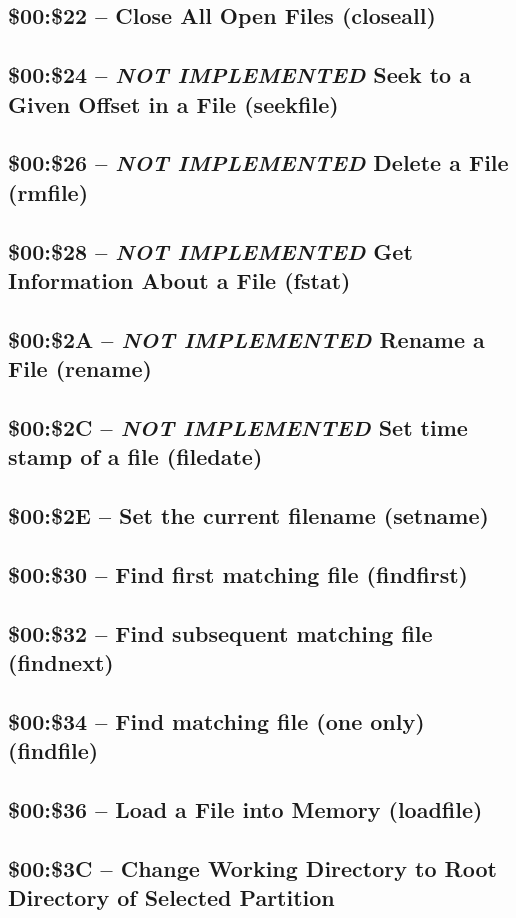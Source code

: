 \subsection{\$00:\$22 -- Close All Open Files (closeall)}
\subsection{\$00:\$24 -- {\em NOT IMPLEMENTED} Seek to a Given Offset in a File (seekfile)}
\subsection{\$00:\$26 -- {\em NOT IMPLEMENTED} Delete a File (rmfile)}
\subsection{\$00:\$28 -- {\em NOT IMPLEMENTED} Get Information About a File (fstat)}
\subsection{\$00:\$2A -- {\em NOT IMPLEMENTED} Rename a File (rename)}
\subsection{\$00:\$2C -- {\em NOT IMPLEMENTED} Set time stamp of a file (filedate)}
\subsection{\$00:\$2E -- Set the current filename (setname)}

\subsection{\$00:\$30 -- Find first matching file (findfirst)}
\subsection{\$00:\$32 -- Find subsequent matching file (findnext)}
\subsection{\$00:\$34 -- Find matching file (one only) (findfile)}
\subsection{\$00:\$36 -- Load a File into Memory (loadfile)}
\subsection{\$00:\$3C -- Change Working Directory to Root Directory of Selected Partition}

